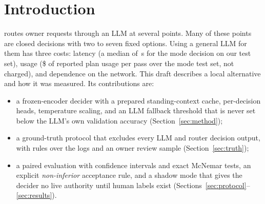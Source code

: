 \section{Introduction}
\sys{} routes owner requests through an LLM at several points. Many of these points are closed decisions with two to seven fixed options. Using a general LLM for them has three costs: latency (a median of \dOneLlmMed{}\,s for the mode decision on our test set), usage (\$\dOneUsd{} of reported plan usage per pass over the mode test set, not charged), and dependence on the network. This draft describes a local alternative and how it was measured. Its contributions are:
\begin{itemize}
\item a frozen-encoder decider with a prepared standing-context cache, per-decision heads, temperature scaling, and an LLM fallback threshold that is never set below the LLM's own validation accuracy (Section~\ref{sec:method});
\item a ground-truth protocol that excludes every LLM and router decision output, with rules over the logs and an owner review sample (Section~\ref{sec:truth});
\item a paired evaluation with confidence intervals and exact McNemar tests, an explicit \emph{non-inferior} acceptance rule, and a shadow mode that gives the decider no live authority until human labels exist (Sections~\ref{sec:protocol}--\ref{sec:results}).
\end{itemize}
